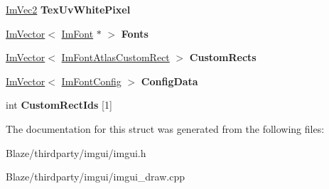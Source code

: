 \begin{DoxyCompactItemize}
\hyperlink{structImVec2}{Im\+Vec2} {\bfseries Tex\+Uv\+White\+Pixel}
\item 
\mbox{\label{structImFontAtlas_a0198aeb17ef8bb810ccc8db103b93b1f}} 
\hyperlink{structImVector}{Im\+Vector}$<$ \hyperlink{structImFont}{Im\+Font} $\ast$ $>$ {\bfseries Fonts}
\item 
\mbox{\label{structImFontAtlas_ae3752e66f7454a42e5ae5ec052af537c}} 
\hyperlink{structImVector}{Im\+Vector}$<$ \hyperlink{structImFontAtlasCustomRect}{Im\+Font\+Atlas\+Custom\+Rect} $>$ {\bfseries Custom\+Rects}
\item 
\mbox{\label{structImFontAtlas_afa4f7459807763d032fe2d0022fc0823}} 
\hyperlink{structImVector}{Im\+Vector}$<$ \hyperlink{structImFontConfig}{Im\+Font\+Config} $>$ {\bfseries Config\+Data}
\item 
\mbox{\label{structImFontAtlas_a608ad12c2ccf1eed97b63454e52ccbe8}} 
int {\bfseries Custom\+Rect\+Ids} \mbox{[}1\mbox{]}
\end{DoxyCompactItemize}


The documentation for this struct was generated from the following files\+:\begin{DoxyCompactItemize}
\item 
Blaze/thirdparty/imgui/imgui.\+h\item 
Blaze/thirdparty/imgui/imgui\+\_\+draw.\+cpp\end{DoxyCompactItemize}
